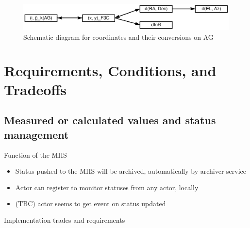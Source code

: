 \documentclass[a4paper,notitlepage]{article}
\begin{document}
\begin{figure}[htb]
  \begin{center}
    \includegraphics{ag_coord_conv.eps}
  \end{center}
  \caption{Schematic diagram for coordinates and their conversions on AG}
  \label{fig:coord_conv}
\end{figure}


\section{Requirements, Conditions, and Tradeoffs}

\subsection{Measured or calculated values and status management}

Function of the MHS
\begin{itemize}
  \item Status pushed to the MHS will be archived, automatically by archiver service
  \item Actor can register to monitor statuses from any actor, locally
  \item (TBC) actor seems to get event on status updated
\end{itemize}

Implementation trades and requirements
\end{document}
